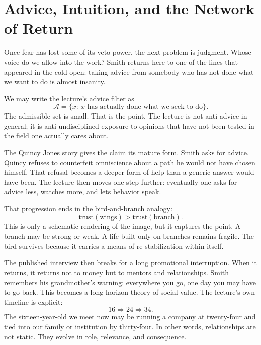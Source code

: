 \section{Advice, Intuition, and the Network of Return}

Once fear has lost some of its veto power, the next problem is judgment. Whose voice do we allow into the work? Smith returns here to one of the lines that appeared in the cold open: taking advice from somebody who has not done what we want to do is almost insanity.

We may write the lecture's advice filter as
\begin{equation}
\mathcal A
=
\{x:\ x \text{ has actually done what we seek to do}\}.
\end{equation}
The admissible set is small. That is the point. The lecture is not anti-advice in general; it is anti-undisciplined exposure to opinions that have not been tested in the field one actually cares about.

The Quincy Jones story gives the claim its mature form. Smith asks for advice. Quincy refuses to counterfeit omniscience about a path he would not have chosen himself. That refusal becomes a deeper form of help than a generic answer would have been. The lecture then moves one step further: eventually one asks for advice less, watches more, and lets behavior speak.

That progression ends in the bird-and-branch analogy:
\begin{equation}
\text{trust}(\text{wings})>\text{trust}(\text{branch}).
\end{equation}
This is only a schematic rendering of the image, but it captures the point. A branch may be strong or weak. A life built only on branches remains fragile. The bird survives because it carries a means of re-stabilization within itself.

The published interview then breaks for a long promotional interruption. When it returns, it returns not to money but to mentors and relationships. Smith remembers his grandmother's warning: everywhere you go, one day you may have to go back. This becomes a long-horizon theory of social value. The lecture's own timeline is explicit:
\begin{equation}
16
\Longrightarrow
24
\Longrightarrow
34.
\end{equation}
The sixteen-year-old we meet now may be running a company at twenty-four and tied into our family or institution by thirty-four. In other words, relationships are not static. They evolve in role, relevance, and consequence.

